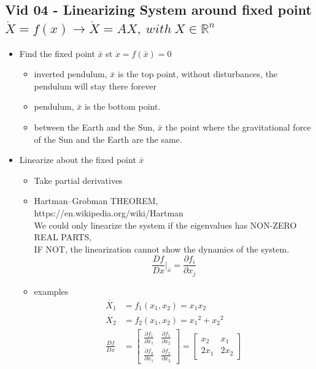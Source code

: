 \documentclass{article}
\begin{document}
\subsection{Vid 04 - Linearizing System around fixed point\\ $\dot{X} = f(x) \rightarrow \dot{X} = AX, ~with~ X\in\mathbb{R}^{n}$}
\begin{itemize}
  \item Find the fixed point $\bar{x}$ st $\dot{x} = f(\bar{x}) = 0$
    \begin{itemize}
      \item inverted pendulum, $\bar{x}$ is the top point, 
            without disturbances, the pendulum will stay there forever
      \item pendulum, $\bar{x}$ is the bottom point.
      \item between the Earth and the Sun, $\bar{x}$ 
            the point where the gravitational force of the Sun and the Earth are the same.
    \end{itemize}
   \item Linearize about the fixed point $\bar{x}$ 
    \begin{itemize}
      \item Take partial derivatives
      \item Hartman–Grobman THEOREM, 
            \\https://en.wikipedia.org/wiki/Hartman%
            \\We could only linearize the system if the eigenvalues has NON-ZERO REAL PARTS,
            \\IF NOT, the linearization cannot show the dynamics of the system.     
        \begin{equation}
          \frac{Df}{Dx}|_{\bar{x}} = \frac{\partial f_{i}}{\partial x_{j}}
        \end{equation}
      \item examples
        \begin{equation}
          \begin{aligned}
            \dot{X_{1}} &= f_{1}(x_{1}, x_{2}) = x_{1}x_{2} \\
            \dot{X_{2}} &= f_{2}(x_{1}, x_{2}) = {x_{1}}^2 + {x_{2}}^2 \\
            \frac{Df}{Dx} & =
            \begin{bmatrix}
              \frac{\partial f_{1}}{\partial x_{1}}  & \frac{\partial f_{1}}{\partial x_{2}} \\ 
              \frac{\partial f_{2}}{\partial x_{1}}  & \frac{\partial f_{2}}{\partial x_{2}} 
            \end{bmatrix}
            =
            \begin{bmatrix}
               x_{2} &  x_{1} \\ 
              2x_{1} & 2x_{2} 
            \end{bmatrix}
          \end{aligned}
        \end{equation}
    \end{itemize}
\end{itemize}
\end{document}

